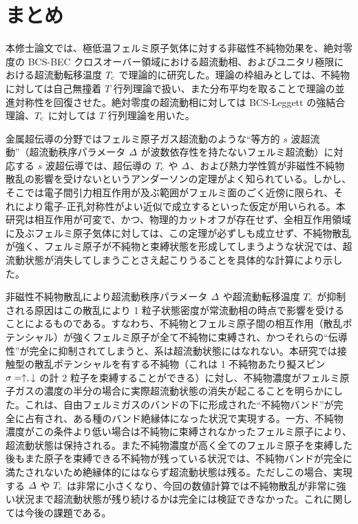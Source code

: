 \chapter{まとめ}

本修士論文では、極低温フェルミ原子気体に対する非磁性不純物効果を、絶対零度の BCS-BEC クロスオーバー領域における超流動相、およびユニタリ極限における超流動転移温度 $T_{\text{c}}$ で理論的に研究した。理論の枠組みとしては、不純物に対しては自己無撞着 $T$ 行列理論で扱い、また分布平均を取ることで理論の並進対称性を回復させた。絶対零度の超流動相に対しては BCS-Leggett の強結合理論、$T_{\text{c}}$ に対しては $T$ 行列理論を用いた。

金属超伝導の分野ではフェルミ原子ガス超流動のような“等方的 $s$ 波超流動”（超流動秩序パラメータ $\varDelta$ が波数依存性を持たないフェルミ超流動）に対応する $s$ 波超伝導では、超伝導の $T_{\text{c}}$ や $\varDelta$、および熱力学性質が非磁性不純物散乱の影響を受けないというアンダーソンの定理がよく知られている。しかし、そこでは電子間引力相互作用が及ぶ範囲がフェルミ面のごく近傍に限られ、それにより電子-正孔対称性がよい近似で成立するといった仮定が用いられる。本研究は相互作用が可変で、かつ、物理的カットオフが存在せず、全相互作用領域に及ぶフェルミ原子気体に対しては、この定理が必ずしも成立せず、不純物散乱が強く、フェルミ原子が不純物と束縛状態を形成してしまうような状況では、超流動状態が消失してしまうことさえ起こりうることを具体的な計算により示した。

非磁性不純物散乱により超流動秩序パラメータ $\varDelta$ や超流動転移温度 $T_{\text{c}}$ が抑制される原因はこの散乱により 1 粒子状態密度が常流動相の時点で影響を受けることによるものである。すなわち、不純物とフェルミ原子間の相互作用（散乱ポテンシャル）が強くフェルミ原子が全て不純物に束縛され、かつそれらの“伝導性”が完全に抑制されてしまうと、系は超流動状態にはなれない。本研究では接触型の散乱ポテンシャルを有する不純物（これは 1 不純物あたり擬スピン $\sigma=\uparrow, \downarrow$ の計 2 粒子を束縛することができる）に対し、不純物濃度がフェルミ原子ガスの濃度の半分の場合に実際超流動状態の消失が起こることを明らかにした。これは、自由フェルミガスのバンドの下に形成された“不純物バンド”が完全に占有され、ある種のバンド絶縁体になった状況で実現する。一方、不純物濃度がこの条件より低い場合は不純物に束縛されなかったフェルミ原子により、超流動状態は保持される。また不純物濃度が高く全てのフェルミ原子を束縛した後もまた原子を束縛できる不純物が残っている状況では、不純物バンドが完全に満たされないため絶縁体的にはならず超流動状態は残る。ただしこの場合、実現する $\varDelta$ や $T_{\text{c}}$ は非常に小さくなり、今回の数値計算では不純物散乱が非常に強い状況まで超流動状態が残り続けるかは完全には検証できなかった。これに関しては今後の課題である。

